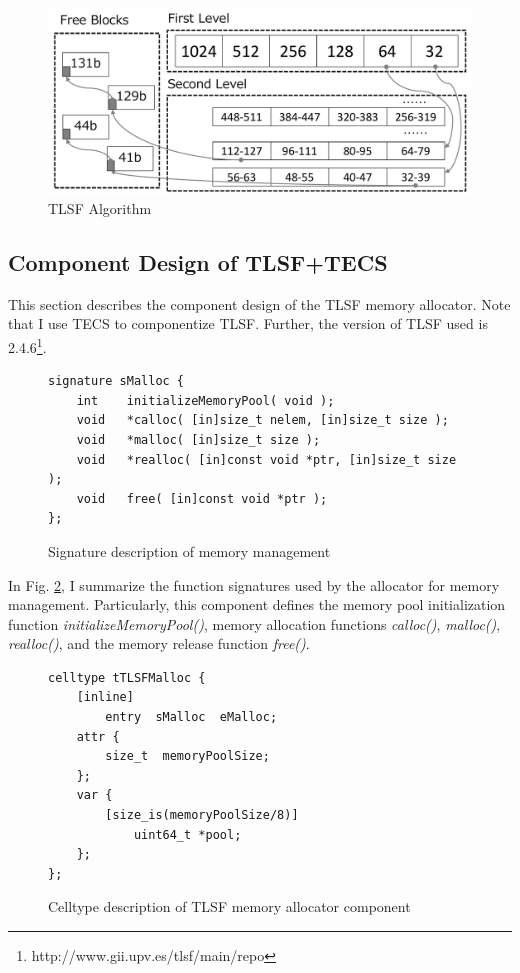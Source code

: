 \documentclass[a4j,12pt,oneside,openany,english]{jsbook}
\begin{document}
\begin{figure}[t]
    \centering
    \includegraphics[width=12cm,clip]{figure/TLSF.pdf}
    \caption{TLSF Algorithm}
    \label{fig:TLSF}
\end{figure}


\subsection{Component Design of TLSF+TECS}

This section describes the component design of the TLSF memory allocator.
Note that I use TECS to componentize TLSF.
Further, the version of TLSF used is 2.4.6\footnote{http://www.gii.upv.es/tlsf/main/repo}.

\begin{figure}[t]
\centering
\begin{lstlisting}
signature sMalloc {
    int    initializeMemoryPool( void );
    void   *calloc( [in]size_t nelem, [in]size_t size );
    void   *malloc( [in]size_t size );
    void   *realloc( [in]const void *ptr, [in]size_t size );
    void   free( [in]const void *ptr );
};
\end{lstlisting}
\caption{Signature description of memory management}  
\label{src:TLSFSignature}
\end{figure}

In Fig. \ref{src:TLSFSignature}, I summarize the function signatures used by the allocator for memory management.
Particularly, this component defines the memory pool initialization function {\it initializeMemoryPool()}, memory allocation functions {\it calloc()}, {\it malloc()}, {\it realloc()}, and the memory release function {\it free()}.

\begin{figure}[t]
\centering
\begin{lstlisting}
celltype tTLSFMalloc {
    [inline]
        entry  sMalloc  eMalloc;
    attr {
        size_t  memoryPoolSize;
    };
    var {
        [size_is(memoryPoolSize/8)]
            uint64_t *pool;
    };
};
\end{lstlisting}
\caption{Celltype description of TLSF memory allocator component}  
\label{src:TLSFCelltype}
\end{figure}
\end{document}

